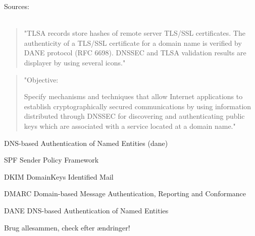 \documentclass[Screen16to9,17pt]{foils}
\begin{document}
Sources:\\
{\tiny
{}\\
}




\begin{quote}
"TLSA records store hashes of remote server TLS/SSL certificates. The authenticity of a TLS/SSL certificate for a domain name is verified by DANE protocol (RFC 6698). DNSSEC and TLSA validation results are displayer by using several icons."
\end{quote}



\begin{quote}
"Objective:

Specify mechanisms and techniques that allow Internet applications to
establish cryptographically secured communications by using information
distributed through DNSSEC for discovering and authenticating public
keys which are associated with a service located at a domain name."
\end{quote}

\begin{list1}
\item DNS-based Authentication of Named Entities (dane)
\end{list1}


\begin{list2}
\item SPF Sender Policy Framework\\ {\footnotesize{}}
\item DKIM DomainKeys Identified Mail\\
{\footnotesize{}}
\item DMARC Domain-based Message Authentication, Reporting and Conformance\\
{\footnotesize{}}
\item DANE DNS-based Authentication of Named Entities\\ {\footnotesize{}}
\item Brug allesammen, check efter ændringer!
\end{list2}
\end{document}
